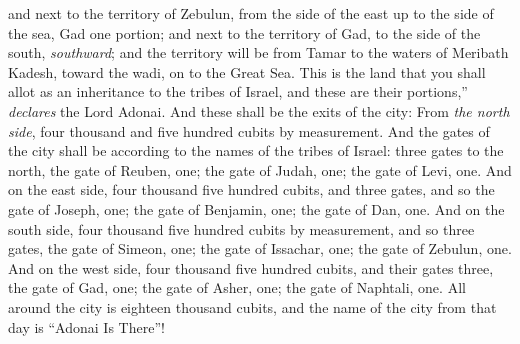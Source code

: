 \begin{biblechapter}
\verse and next to the territory of Zebulun, from the side of the east up to the side of the sea, Gad one portion;
\verse and next to the territory of Gad, to the side of the south, \textit{southward}; and the territory will be from Tamar to the waters of Meribath Kadesh, toward the wadi, on to the Great Sea.
\verse This is the land that you shall allot as an inheritance to the tribes of Israel, and these are their portions,” \textit{declares} the Lord Adonai.
\verse And these shall be the exits of the city: From \textit{the north side}, four thousand and five hundred cubits  by measurement.
\verse And the gates of the city shall be according to the names of the tribes of Israel: three gates to the north, the gate of Reuben, one; the gate of Judah, one; the gate of Levi, one.
\verse And on the east side, four thousand five hundred cubits, and three gates, and so the gate of Joseph, one; the gate of Benjamin, one; the gate of Dan, one.
\verse And on the south side, four thousand five hundred cubits by measurement, and so three gates, the gate of Simeon, one; the gate of Issachar, one; the gate of Zebulun, one.
\verse And on the west side, four thousand five hundred cubits, and their gates three, the gate of Gad, one; the gate of Asher, one; the gate of Naphtali, one.
\verse All around the city is eighteen thousand cubits, and the name of the city from that day is “Adonai Is There”!
\end{biblechapter}

